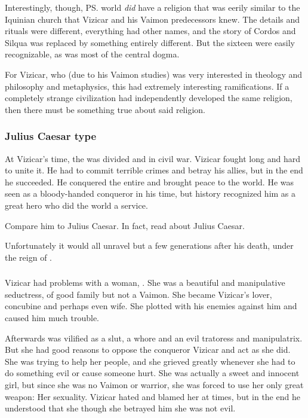 Interestingly, though, \ps{\Tydesmos} world \emph{did} have a religion that was eerily similar to the Iquinian church that Vizicar and his Vaimon predecessors knew. 
The details and rituals were different, everything had other names, and the story of Cordos and Silqua was replaced by something entirely different.
But the sixteen \sephiroth{} were easily recognizable, as was most of the central dogma. 

For Vizicar, who (due to his Vaimon studies) was very interested in theology and philosophy and metaphysics, this had extremely interesting ramifications. 
If a completely strange civilization had independently developed the same religion, then there must be something true about said religion. 





\subsubsection{Julius Caesar type}
At Vizicar's time, the \VaimonCaliphate was divided and in civil war. 
Vizicar fought long and hard to unite it.
He had to commit terrible crimes and betray his allies, but in the end he succeeded.
He conquered the entire \caliphate and brought peace to the world. 
He was seen as a bloody-handed conqueror in his time, but history recognized him as a great hero who did the world a service. 

Compare him to Julius Caesar.
In fact, read about Julius Caesar. 

Unfortunately it would all unravel but a few generations after his death, under the reign of \Belzir.





\subsubsection{\Ivesser}
Vizicar had problems with a woman, \Ivesser. 
She was a beautiful and manipulative seductress, of good family but not a Vaimon. 
She became Vizicar's lover, concubine and perhaps even wife. 
She plotted with his enemies against him and caused him much trouble. 

Afterwards \Ivesser was vilified as a slut, a whore and an evil tratoress and manipulatrix. 
But she had good reasons to oppose the conqueror Vizicar and act as she did.
She was trying to help her people, and she grieved greatly whenever she had to do something evil or cause someone hurt. 
She was actually a sweet and innocent girl, but since she was no Vaimon or warrior, she was forced to use her only great weapon: 
Her sexuality.
Vizicar hated and blamed her at times, but in the end he understood that she though she betrayed him she was not evil. 

